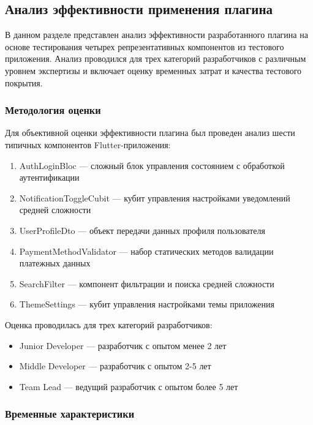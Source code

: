 \documentclass[14pt, russian]{scrartcl}
\begin{document}
\subsection{Анализ эффективности применения плагина}

В данном разделе представлен анализ эффективности разработанного плагина на основе тестирования четырех репрезентативных компонентов из тестового приложения. Анализ проводился для трех категорий разработчиков с различным уровнем экспертизы и включает оценку временных затрат и качества тестового покрытия.

\subsubsection{Методология оценки}

Для объективной оценки эффективности плагина был проведен анализ шести типичных компонентов Flutter-приложения:

\begin{enumerate}
    \item AuthLoginBloc — сложный блок управления состоянием с обработкой аутентификации
    \item NotificationToggleCubit — кубит управления настройками уведомлений средней сложности
    \item UserProfileDto — объект передачи данных профиля пользователя
    \item PaymentMethodValidator — набор статических методов валидации платежных данных
    \item SearchFilter — компонент фильтрации и поиска средней сложности
    \item ThemeSettings — кубит управления настройками темы приложения
\end{enumerate}

Оценка проводилась для трех категорий разработчиков:
\begin{itemize}
    \item Junior Developer — разработчик с опытом менее 2 лет
    \item Middle Developer — разработчик с опытом 2-5 лет  
    \item Team Lead — ведущий разработчик с опытом более 5 лет
\end{itemize}

\subsubsection{Временные характеристики}
\end{document}
